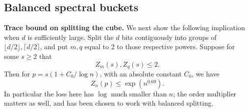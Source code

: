 \subsection{Balanced spectral buckets}
\begin{proposition}\label{tra:inverse-color:recursion}
\label{tra:inverse-color:trace-recursion-statement}
\textbf{Trace bound on splitting the cube.} We next show the following implication when \(d\) is sufficiently large. Split the \(d\) bits contiguously into groups of \(\lfloor d/2\rfloor,\lceil d/2\rceil\), and put \(m,q\) equal to 2 to those respective powers. Suppose for some \(s\ge 2\) that
\[
                              Z_m(s), Z_q(s)\le 2.
\]
Then for \(p=s(1+C_0/\log n)\), with an absolute constant \(C_0\), we have
\begin{equation}
                              Z_n(p)\le \exp(n^{0.60}).                         \label{tra:inverse-color:eq5}
\end{equation}
In particular the loss here has \(\log\) much smaller than \(n\); the order multiplier matters as well, and has been chosen to work with balanced splitting.
\end{proposition}
